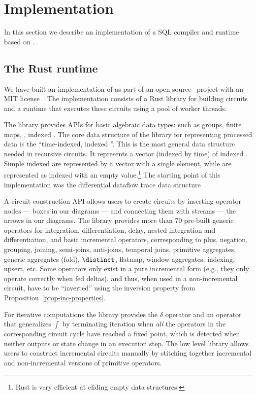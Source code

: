 \section{Implementation}\label{sec:implementation}

In this section we describe an implementation of a SQL compiler and
runtime based on \dbsp.

\subsection{The \dbsp Rust runtime}\label{sec:runtime}

We have built an implementation of \dbsp as part of an
open-source~\cite{dbsp-repo} project with an MIT
license~\cite{dbsp-crate}.  The implementation consists of a Rust
library for building circuits and a runtime that executes these
circuits using a pool of worker threads.

The library provides APIs for basic algebraic data types: such as
groups, finite maps, \zrs, indexed \zrs.  The core data structure of
the library for representing processed data is the ``time-indexed,
indexed \zr''.  This is the most general data structure needed in
recursive circuits.  It represents a vector (indexed by time) of
indexed \zrs.  Simple indexed \zrs are represented by a vector with a
single element, while \zrs are represented as indexed \zrs with an
empty value.\footnote{Rust is very efficient at eliding empty data
structures.}  The starting point of this implementation was the
differential dataflow trace data structure~\cite{dd-crate}.

A circuit construction API allows users to create \dbsp circuits by
inserting operator nodes --- boxes in our diagrams --- and connecting
them with streams --- the arrows in our diagrams.  The library
provides more than 70 pre-built generic operators for integration,
differentiation, delay, nested integration and differentiation, and
basic \zr incremental operators, corresponding to plus, negation,
grouping, joining, semi-joins, anti-joins, temporal joins, primitive
aggregates, generic aggregates (fold), $\distinct$, flatmap, window
aggregates, indexing, upsert, etc.  Some operators only exist in a
pure incremental form (e.g., they only operate correctly when fed
deltas), and thus, when used in a non-incremental circuit, have to be
``inverted'' using the inversion property from
Proposition~\ref{prop-inc-properties}.

For iterative computations the library provides the $\delta$ operator
and an operator that generalizes $\int$ by terminating iteration when
\emph{all} the operators in the corresponding circuit cycle have
reached a fixed point, which is detected when neither outputs or state
change in an execution step.  The low level library allows users to
construct incremental circuits manually by stitching together
incremental and non-incremental versions of primitive operators.

